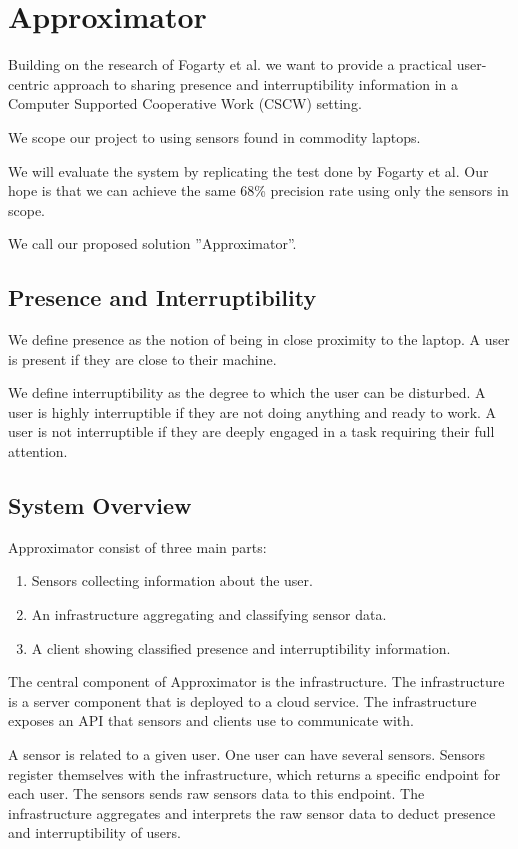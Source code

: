 \documentclass{sigchi}
\begin{document}
\section{Approximator}
Building on the research of Fogarty et al.\cite{fogarty2005predicting} we want to provide a practical user-centric approach to sharing presence and interruptibility information in a Computer Supported Cooperative Work (CSCW) setting.

 We scope our project to using sensors found in commodity laptops.

 We will evaluate the system by replicating the test done by Fogarty et al.
 Our hope is that we can achieve the same 68\% precision rate using only the sensors in scope.

We call our proposed solution ''Approximator''.

\subsection{Presence and Interruptibility}
We define presence as the notion of being in close proximity to the laptop. A user is present if they are close to their machine.

We define interruptibility as the degree to which the user can be disturbed. A user is highly interruptible if they are not doing anything and ready to work. A user is not interruptible if they are deeply engaged in a task requiring their full attention.

\subsection{System Overview}
Approximator consist of three main parts:
\begin{enumerate}
  \item Sensors collecting information about the user.
  \item An infrastructure aggregating and classifying sensor data.
  \item A client showing classified presence and interruptibility information.
\end{enumerate}

The central component of Approximator is the infrastructure.
The infrastructure is a server component that is deployed to a cloud service.
The infrastructure exposes an API that sensors and clients use to communicate with.

A sensor is related to a given user.
One user can have several sensors.
Sensors register themselves with the infrastructure, which returns a specific endpoint for each user.
The sensors sends raw sensors data to this endpoint.
The infrastructure aggregates and interprets the raw sensor data to deduct presence and interruptibility of users.
\end{document}
